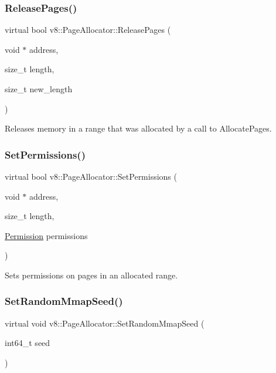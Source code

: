 \subsubsection{\texorpdfstring{Release\+Pages()}{ReleasePages()}}
{\footnotesize\ttfamily virtual bool v8\+::\+Page\+Allocator\+::\+Release\+Pages (\begin{DoxyParamCaption}\item[{void $\ast$}]{address,  }\item[{size\+\_\+t}]{length,  }\item[{size\+\_\+t}]{new\+\_\+length }\end{DoxyParamCaption})\hspace{0.3cm}{\ttfamily [pure virtual]}}

Releases memory in a range that was allocated by a call to Allocate\+Pages. \mbox{\label{classv8_1_1PageAllocator_aa3817d5bfaba9ec280a6cfb60e6adda0}} 
\subsubsection{\texorpdfstring{Set\+Permissions()}{SetPermissions()}}
{\footnotesize\ttfamily virtual bool v8\+::\+Page\+Allocator\+::\+Set\+Permissions (\begin{DoxyParamCaption}\item[{void $\ast$}]{address,  }\item[{size\+\_\+t}]{length,  }\item[{\mbox{\hyperlink{classv8_1_1PageAllocator_a88f74b164fe97e053259f67a95758415}{Permission}}}]{permissions }\end{DoxyParamCaption})\hspace{0.3cm}{\ttfamily [pure virtual]}}

Sets permissions on pages in an allocated range. \mbox{\label{classv8_1_1PageAllocator_a9481a73527915fd200f6e1e9ed4b3eba}} 
\subsubsection{\texorpdfstring{Set\+Random\+Mmap\+Seed()}{SetRandomMmapSeed()}}
{\footnotesize\ttfamily virtual void v8\+::\+Page\+Allocator\+::\+Set\+Random\+Mmap\+Seed (\begin{DoxyParamCaption}\item[{int64\+\_\+t}]{seed }\end{DoxyParamCaption})\hspace{0.3cm}{\ttfamily [pure virtual]}}

